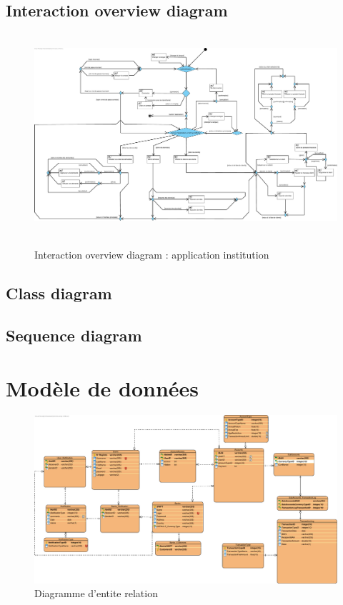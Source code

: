 \documentclass[]{report}
\begin{document}
\newpage

\subsection{Interaction overview diagram}



\vspace{2.5cm}
\begin{figure}[h!]
\hbox{
	\centering\includegraphics[width=\linewidth]{img/Interaction Overview Institution.pdf}
}
\caption{Interaction overview diagram : application institution}
\end{figure}

\newpage

\subsection{Class diagram}



\newpage

\subsection{Sequence diagram}

\newpage

\section{Modèle de données}

\begin{figure}[h]
	\centering\includegraphics[width=\linewidth]{img/BDD.pdf}
	\caption{Diagramme d'entite relation}
\end{figure}

\end{document}

